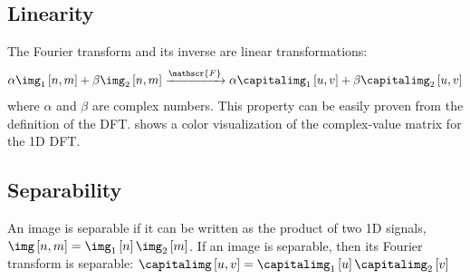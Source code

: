 \subsection{Linearity}

The Fourier transform and its inverse are linear transformations:
\begin{equation}
\alpha \img_1 \left[n,m \right] + \beta \img_2 \left[ n,m \right]  
\xrightarrow{\mathscr{F}} 
\alpha \capitalimg_1 \left[u,v \right] + \beta \capitalimg_2 \left[ u,v \right]
\end{equation}
where $\alpha$ and $\beta$ are complex numbers. This property can be easily proven from the definition of the DFT. \Fig{\ref{fig:colorDFT}} shows a color visualization of the complex-value matrix for the 1D DFT.

\subsection{Separability}

An image is separable if it can be written as the product of two 1D signals, $\img \left[n,m \right] = \img_1\left[n \right] \img_2\left[m \right]$. If an image is separable, then its Fourier transform is separable:
%
$\capitalimg \left[u,v \right] = \capitalimg_1 \left[u \right] \capitalimg_2 \left[v \right]$

